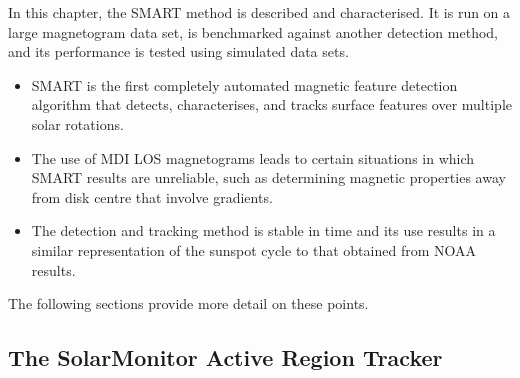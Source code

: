 In this chapter, the \gls{SMART} method is described and characterised. It is run on a large magnetogram data set, is benchmarked against another detection method, and its performance is tested using simulated data sets.
\begin{itemize}
\item \gls{SMART} is the first completely automated magnetic feature detection algorithm that detects, characterises, and tracks surface features over multiple solar rotations.
\item The use of MDI \gls{LOS} magnetograms leads to certain situations in which \gls{SMART} results are unreliable, such as determining magnetic properties away from disk centre that involve gradients.
\item The detection and tracking method is stable in time and its use results in a similar representation of the sunspot cycle to that obtained from \gls{NOAA} results.
\end{itemize}
The following sections provide more detail on these points.

\subsection{The SolarMonitor Active Region Tracker}

